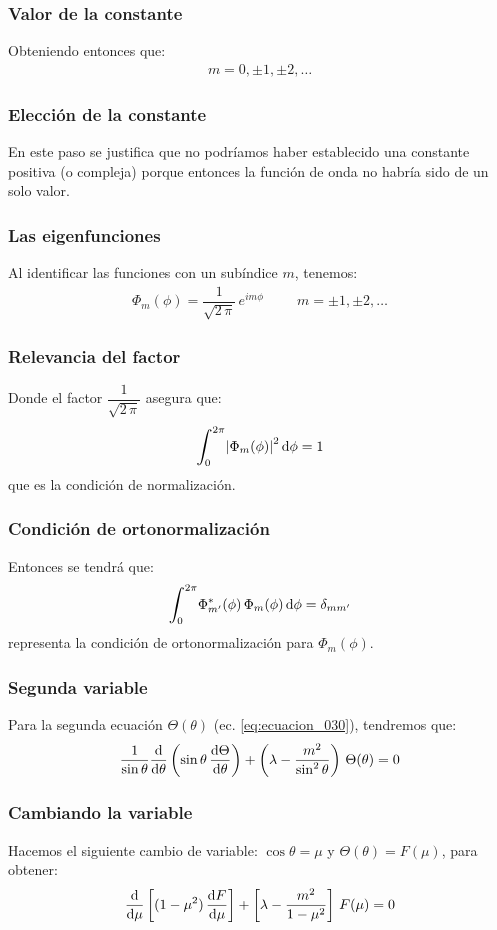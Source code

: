 \documentclass[12pt]{beamer}
\begin{document}
\begin{frame}
\frametitle{Valor de la constante}
Obteniendo entonces que:
\pause
\begin{align*}
m = 0, \pm 1, \pm 2, \ldots
\end{align*}
\end{frame}
\begin{frame}
\frametitle{Elección de la constante}
En este paso se justifica que no podríamos haber establecido una constante positiva (o compleja) porque entonces la función de onda no habría sido de un solo valor.
\end{frame}
\begin{frame}
\frametitle{Las eigenfunciones}
Al identificar las funciones con un subíndice $m$, tenemos:
\pause
\begin{align}
\Phi_{m}(\phi) = \dfrac{1}{\sqrt{2 \, \pi}} \, e^{i m \phi} \hspace{1cm} m = \pm 1, \pm 2, \ldots
\label{eq:ecuacion_032}
\end{align}
\end{frame}
\begin{frame}
\frametitle{Relevancia del factor}
Donde el factor $\dfrac{1}{\sqrt{2 \, \pi}}$ asegura que:
\pause
\begin{align*}
\scaleint{6ex}_{\bs 0}^{2 \pi} \abs{\Phi_{m}(\phi)}^{2} \dd{\phi} = 1
\end{align*}
que es la condición de normalización.
\end{frame}
\begin{frame}
\frametitle{Condición de ortonormalización}
Entonces se tendrá que:
\pause
\begin{align}
\scaleint{6ex}_{\bs 0}^{2 \pi} \Phi_{\ptilde{m}}^{*}(\phi) \, \Phi_{m}(\phi) \dd{\phi} = \delta_{m \ptilde{m}}
\label{eq:ecuacion_033}
\end{align}
representa la condición de ortonormalización para $\Phi_{m}(\phi)$.
\end{frame}
\begin{frame}
\frametitle{Segunda variable}
Para la segunda ecuación $\Theta (\theta)$ (ec. \ref{eq:ecuacion_030}), tendremos que:
\pause
\begin{align}
\dfrac{1}{\sin \theta} \dv{\theta} \left( \sin \theta \, \dv{\Theta}{\theta} \right) + \left( \lambda - \dfrac{m^{2}}{\sin^{2} \theta} \right) \, \Theta (\theta) = 0
\label{eq:ecuacion_034}
\end{align}
\end{frame}
\begin{frame}
\frametitle{Cambiando la variable}
Hacemos el siguiente cambio de variable: $\cos \theta = \mu$ y $\Theta(\theta) = F(\mu)$, para obtener:
\pause
\begin{align}
\dv{\mu} \left[ (1 - \mu^{2}) \, \dv{F}{\mu} \right] + \left[ \lambda - \dfrac{m^{2}}{1 - \mu^{2}} \right] \, F(\mu) = 0
\label{eq:ecuacion_035}
\end{align}
\end{frame}
\end{document}
